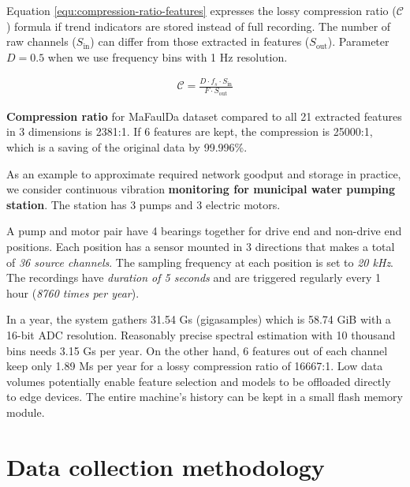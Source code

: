 Equation \ref{equ:compression-ratio-features} expresses the lossy compression ratio ($\mathcal{C}$) formula if trend indicators are stored instead of full recording. The number of raw channels ($S_{\mathrm{in}}$) can differ from those extracted in features ($S_{\mathrm{out}}$). Parameter $D = 0.5$ when we use frequency bins with 1 Hz resolution.

\begin{ceqn}\begin{align} \label{equ:compression-ratio-features}
\mathcal{C} = \frac{D \cdot f_s \cdot S_{\mathrm{in}}}{F \cdot S_{\mathrm{out}}}
\end{align}\end{ceqn}

\textbf{Compression ratio} for MaFaulDa dataset compared to all 21 extracted features in 3 dimensions is 2381:1. If 6 features are kept, the compression is 25000:1, which is a saving of the original data by 99.996\%.

As an example to approximate required network goodput and storage in practice, we consider continuous vibration \textbf{monitoring for municipal water pumping station}. The station has 3 pumps and 3 electric motors. 

A pump and motor pair have 4 bearings together for drive end and non-drive end positions. Each position has a sensor mounted in 3 directions that makes a total of \emph{36 source channels}. The sampling frequency at each position is set to \emph{20 kHz}. The recordings have \emph{duration of 5 seconds} and are triggered regularly every 1 hour (\emph{8760 times per year}).

In a year, the system gathers 31.54 Gs (gigasamples) which is 58.74 GiB with a 16-bit ADC resolution. Reasonably precise spectral estimation with 10 thousand bins needs 3.15 Gs per year. On the other hand, 6 features out of each channel keep only 1.89 Ms per year for a lossy compression ratio of 16667:1. Low data volumes potentially enable feature selection and models to be offloaded directly to edge devices. The entire machine's history can be kept in a small flash memory module.


\section{Data collection methodology}




